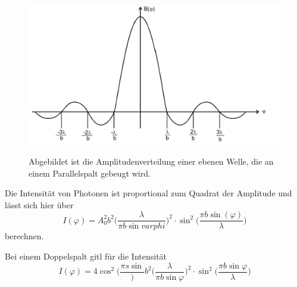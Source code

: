  \begin{figure}[H]
    \centering
    \caption{Abgebildet ist die Amplitudenverteilung einer ebenen Welle, die an einem Parallelspalt gebeugt wird.}
    \includegraphics{Bilder/Amplitude.png}
    \label{fig:Amplitude}
\end{figure}

Die Intensität von Photonen ist proportional zum Quadrat der Amplitude und lässt sich hier über 
\begin{equation}
    I(\varphi)=A_0^2 b^2 \biggl( \frac{\lambda}{\pi b \sin{varphi}}\biggr)^2 \cdot \sin^2 \biggl( \frac{\pi b \sin(\varphi)}{\lambda}\biggr)
    \label{fig:Intensität}
\end{equation}
berechnen.

Bei einem Doppelspalt gitl für die Intensität
\begin{equation}
    I(\varphi)=4 \cos^2(\frac{\pi s \sin}) b^2 \biggl( \frac{\lambda}{\pi b \sin \varphi}\biggr)^2 \cdot \sin^2 \biggl( \frac{\pi b \sin \varphi}{\lambda}\biggr)
    \label{fig:Intensität2}
\end{equation}